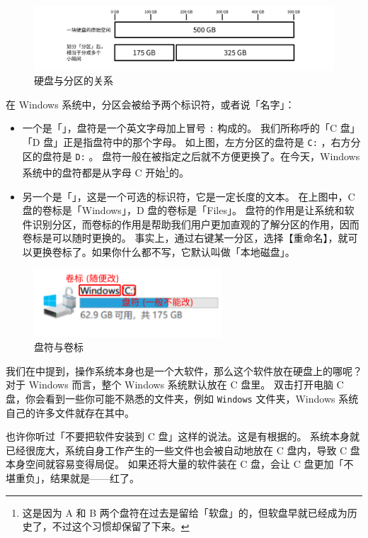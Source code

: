 \begin{figure}[htb!]
  \centering
  \includegraphics[width=12cm]{assets/Disk_Parts.png}
  \caption{硬盘与分区的关系}
  \label{Disk_Parts}
\end{figure}

在 Windows 系统中，分区会被给予两个标识符，或者说「名字」：

\begin{itemize}
  \item 一个是「」，盘符是一个英文字母加上冒号 \verb|:| 构成的。
    我们所称呼的「C 盘」「D 盘」正是指盘符中的那个字母。
    如上图，左方分区的盘符是 \verb|C:| ，右方分区的盘符是 \verb|D:| 。
    盘符一般在被指定之后就不方便更换了。在今天，Windows 系统中的盘符都是从字母 C 开始\footnote{这是因为 A 和 B 两个盘符在过去是留给「软盘」的，但软盘早就已经成为历史了，不过这个习惯却保留了下来。}的。
  \item 另一个是「」，这是一个可选的标识符，它是一定长度的文本。
    在上图中，C 盘的卷标是「Windows」，D 盘的卷标是「Files」。
    盘符的作用是让系统和软件识别分区，而卷标的作用是帮助我们用户更加直观的了解分区的作用，因而卷标是可以随时更换的。
    事实上，通过右键某一分区，选择【重命名】，就可以更换卷标了。如果你什么都不写，它默认叫做「本地磁盘」。
\end{itemize}

\begin{figure}[htb!]
  \centering
  \includegraphics[width=7cm]{assets/Volume_Name_and_Letter.png}
  \caption{盘符与卷标}
  \label{Volume_Name_and_Letter}
\end{figure}

我们在中提到，操作系统本身也是一个大软件，那么这个软件放在硬盘上的哪呢？
对于 Windows 而言，整个 Windows 系统默认放在 C 盘里。
双击打开电脑 C 盘，你会看到一些你可能不熟悉的文件夹，例如 \verb|Windows| 文件夹，Windows 系统自己的许多文件就存在其中。

也许你听过「不要把软件安装到 C 盘」这样的说法。这是有根据的。
系统本身就已经很庞大，系统自身工作产生的一些文件也会被自动地放在 C 盘内，导致 C 盘本身空间就容易变得局促。
如果还将大量的软件装在 C 盘，会让 C 盘更加「不堪重负」，结果就是——红了。

